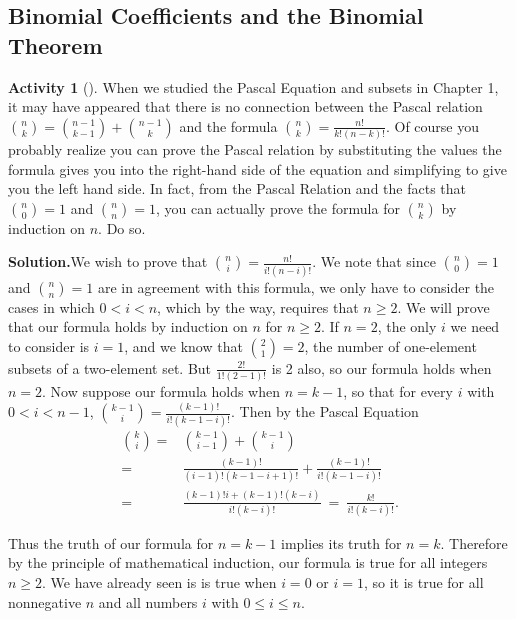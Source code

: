 \documentclass[10pt,]{book}
\theoremstyle{plain}
\theoremstyle{definition}
\newtheorem{activity}[project]{Activity}
\numberwithin{equation}{chapter}
\newcommand{\lt}{<}
\newcommand{\amp}{&}
\begin{document}
\subsection[{Binomial Coefficients and the Binomial Theorem}]{Binomial Coefficients and the Binomial Theorem}\label{subsection-12}
\begin{activity}[]\label{activity-72}
When we studied the Pascal Equation and subsets in Chapter 1, it may have appeared that there is no connection between the Pascal relation \(\binom{n}{k} = \binom{n-1}{k-1} +\binom{n-1}{k}\) and the formula \(\binom{n}{k}=\frac{n!}{k!(n-k)!}\). Of course you probably realize you can prove the Pascal relation by substituting the values the formula gives you into the right-hand side of the equation and simplifying to give you the left hand side. In fact, from the Pascal Relation and the facts that \(\binom{n}{0}=1\) and \(\binom{n}{n}=1\), you can actually prove the formula for \(\binom{n}{k}\) by induction on \(n\). Do so.%
\par\medskip\noindent%
\textbf{Solution.}\quad We wish to prove that \(\binom{n}{i} =\frac{n!}{i!(n-i)!}\). We note that since \(\binom{n}{0}=1\) and \(\binom{n}{n} =1\) are in agreement with this formula, we only have to consider the cases in which \(0\lt i\lt n\), which by the way, requires that \(n\ge 2\). We will prove that our formula holds by induction on \(n\) for \(n\ge 2\). If \(n=2\), the only \(i\) we need to consider is \(i=1\), and we know that \(\binom{2}{1}=2\), the number of one-element subsets of a two-element set. But \(\frac{2!}{1!(2-1)!}\) is 2 also, so our formula holds when \(n=2\). Now suppose our formula holds when \(n=k-1\), so that for every \(i\) with \(0\lt i\lt n-1\), \(\binom{k-1}{i} =
\frac{(k-1)!}{i!(k-1-i)!}\). Then by the Pascal Equation%
\begin{align*}
\binom{k}{i} =\amp \binom{k-1}{i-1}+\binom{k-1}{i}\\
=\amp
\frac{(k-1)!}{(i-1)!(k-1-i+1)!} + \frac{(k-1)!}{i!(k-1-i)!}\\
=\amp \frac{(k-1)!i+(k-1)!(k-i)}{i!(k-i)!} \ =\  \frac{k!}{i!(k-i)!}.
\end{align*}
%
\par
Thus the truth of our formula for \(n=k-1\) implies its truth for \(n=k\). Therefore by the principle of mathematical induction, our formula is true for all integers \(n\ge 2\). We have already seen is is true when \(i=0\) or \(i=1\), so it is true for all nonnegative \(n\) and all numbers \(i\) with \(0\le i\le n\).%
\end{activity}
\end{document}
